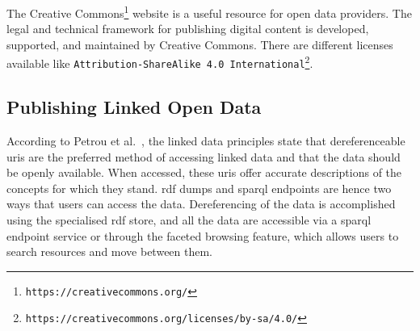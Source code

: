 \begin{doublespace}
The Creative Commons\footnote{\tt https://creativecommons.org/} 
website is a useful resource for open data providers. 
The legal and technical framework for publishing digital content is 
developed, supported, and maintained by Creative Commons. 
There are different licenses available like  
{\tt Attribution-ShareAlike 4.0 International}\footnote{\tt https://creativecommons.org/licenses/by-sa/4.0/}.

\subsection{Publishing Linked Open Data}
\label{subsec:publishinglod}

According to Petrou et al.~\cite{irene2014publishlod}, 
the linked data principles state that dereferenceable \ac{uri}s 
are the preferred method of accessing linked data and that the data should be openly available. 
When accessed, 
these \ac{uri}s offer accurate descriptions of the concepts for which they stand. 
\ac{rdf} dumps and \ac{sparql} endpoints are hence 
two ways that users can access the data. 
Dereferencing of the data is accomplished using the specialised \ac{rdf} store, 
and all the data are accessible via a \ac{sparql} endpoint service 
or through the faceted browsing feature, 
which allows users to search resources and move between them.

\end{doublespace}
